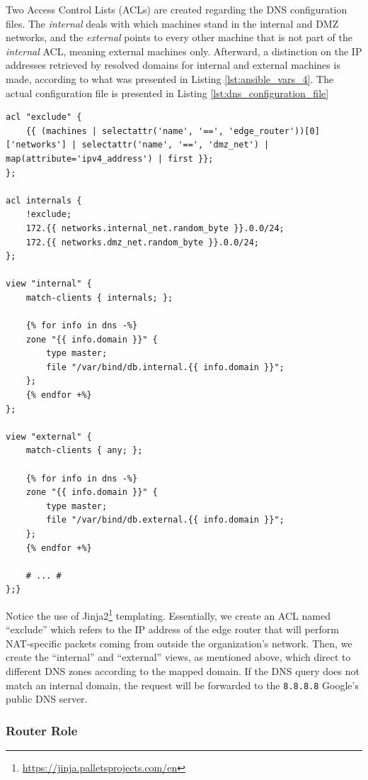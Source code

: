 Two Access Control Lists (ACLs) are created regarding the DNS configuration files. The \textit{internal} deals with which machines stand in the internal and DMZ networks, and the \textit{external} points to every other machine that is not part of the \textit{internal} ACL, meaning external machines only. Afterward, a distinction on the IP addresses retrieved by resolved domains for internal and external machines is made, according to what was presented in Listing \ref{lst:ansible_vars_4}. The actual configuration file is presented in Listing \ref{lst:dns_configuration_file}

\begin{lstlisting}[caption=DNS Server Template Configuration.,numbers=none,label={lst:dns_configuration_file}]
acl "exclude" {
    {{ (machines | selectattr('name', '==', 'edge_router'))[0]['networks'] | selectattr('name', '==', 'dmz_net') | map(attribute='ipv4_address') | first }};
};

acl internals {
    !exclude;
    172.{{ networks.internal_net.random_byte }}.0.0/24;
    172.{{ networks.dmz_net.random_byte }}.0.0/24;
};

view "internal" {
    match-clients { internals; };

    {% for info in dns -%}
    zone "{{ info.domain }}" {
        type master;
        file "/var/bind/db.internal.{{ info.domain }}";
    };
    {% endfor +%}
};

view "external" {
    match-clients { any; };

    {% for info in dns -%}
    zone "{{ info.domain }}" {
        type master;
        file "/var/bind/db.external.{{ info.domain }}";
    };
    {% endfor +%}

    # ... #
};}
\end{lstlisting}

Notice the use of Jinja2\footnote{\url{https://jinja.palletsprojects.com/en}} templating. Essentially, we create an ACL named ``exclude'' which refers to the IP address of the edge router that will perform NAT-specific packets coming from outside the organization's network. Then, we create the ``internal'' and ``external'' views, as mentioned above, which direct to different DNS zones according to the mapped domain. If the DNS query does not match an internal domain, the request will be forwarded to the \texttt{8.8.8.8} Google's public DNS server.

\subsubsection{Router Role} \label{sec:ansible_router_role}

